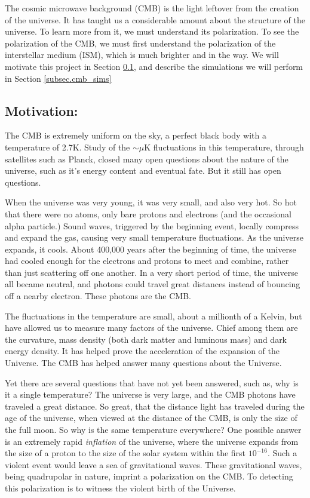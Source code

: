 The cosmic microwave background (CMB) is the light leftover from the creation of
the universe.  It has taught us a considerable amount about the structure of the
universe.  To learn more from it, we must understand its polarization.  To see
the polarization of the CMB, we must first understand the polarization of the
interstellar medium (ISM), which is much brighter and in the way.  We will
motivate this project in Section \ref{subsec.cmb_motivate}, and describe the
simulations we will perform in Section \ref{subsec.cmb_sims}

\subsection{Motivation: \nameCMB}
\label{subsec.cmb_motivate}

The CMB is extremely uniform on the sky, a perfect black body with a
temperature of 2.7K. Study of the $\sim \mu$K fluctuations in this temperature, through satellites such as Planck, closed many open
questions about the nature of the universe, such as it's energy content and
eventual fate.  But it still has open questions.

When the universe was very young, it was very small, and also very hot.  So hot
that there were no atoms, only bare protons and electrons (and the occasional
alpha particle.)  Sound waves, triggered by the
beginning event, locally compress and expand the gas, causing very small
temperature fluctuations.  As the universe expands, it cools.  About 400,000
years after the beginning of time, the universe had cooled enough for the electrons and
protons to meet and combine, rather than just scattering off one another.  In a
very short period of time, the universe all became neutral, and photons could
travel great distances instead of bouncing off a nearby electron.  These photons
are the CMB.

The fluctuations in the temperature are small, about a millionth of a Kelvin,
but have allowed us to measure many factors of the universe.  Chief among them
are the curvature, mass density (both dark matter and luminous mass) and dark energy
density.  It has helped prove the acceleration of the expansion of the Universe.
The CMB has helped answer many questions about the Universe.

Yet there are several questions that
have not yet been answered, such as, why is it a single temperature?  The
universe is very large, and the CMB photons have traveled a great distance.  So
great, that the distance light has traveled during the age of the universe, when
viewed at the distance of the CMB, is only the size of the full moon.  So why is
the same temperature everywhere?  One possible answer is an extremely rapid
\emph{inflation} of the universe, where the universe expands from the size of a
proton to the size of the solar system within the first $10^{-16}$.  Such a
violent event would leave a sea of gravitational waves.  These gravitational
waves, being quadrupolar in nature, imprint a polarization on the CMB. To detecting
this polarization is to witness the violent birth of the Universe.

